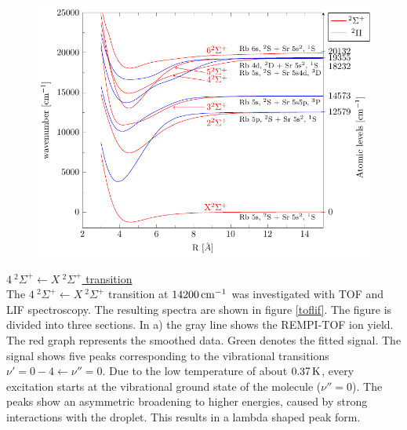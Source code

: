 \documentclass[parskip,12pt,headsepline,a4paper] {scrbook}
\begin{document}
\begin{figure}[ht]
\centerline{
\includegraphics[width=16cm]{./resultsRbSr/MolSpec_PECs.pdf}}
\end{figure}

\newpage

\underline{$4 \ ^2\Sigma^+ \leftarrow X \ ^2\Sigma^+$ transition} \\
The $4 \ ^2\Sigma^+ \leftarrow X \ ^2\Sigma^+$ transition at $\unit[14200]{cm^{-1}}$ was investigated with TOF and LIF spectroscopy. The resulting spectra are shown in figure \ref{toflif}. The figure is divided into three sections. In a) the gray line shows the REMPI-TOF ion yield. The red graph represents the smoothed data. Green denotes the fitted signal. %
The signal shows five peaks corresponding to the vibrational transitions $\nu'=0-4 \leftarrow \nu''=0$. Due to the low temperature of about $\unit[0.37]{K}$, every excitation starts at the vibrational ground state of the molecule ($\nu''=0$). The peaks show an asymmetric broadening to higher energies, caused by strong interactions with the droplet. This results in a lambda shaped peak form.
\end{document}
